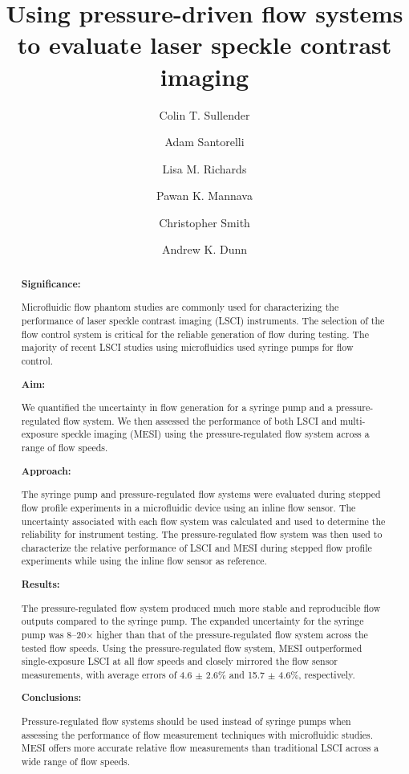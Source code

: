 \documentclass[12pt]{spieman}
\title{Using pressure-driven flow systems to evaluate laser speckle contrast imaging}
\author[a]{Colin T. Sullender}
\author[a]{Adam Santorelli}
\author[a]{Lisa M. Richards}
\author[a]{Pawan K. Mannava}
\author[a]{Christopher Smith}
\author[a,*]{Andrew K. Dunn}
\affil[a]{Department of Biomedical Engineering, The University of Texas at Austin, Austin, TX, 78712, USA}
\newcommand{\abstractsection}[1]{
  \par\addvspace{.5\baselineskip}
  \noindent\textbf{#1: }\ignorespaces
}
\begin{document}
\maketitle


\begin{abstract}

\abstractsection{Significance}
Microfluidic flow phantom studies are commonly used for characterizing the performance of laser speckle contrast imaging (LSCI) instruments. The selection of the flow control system is critical for the reliable generation of flow during testing. The majority of recent LSCI studies using microfluidics used syringe pumps for flow control.

\abstractsection{Aim}
We quantified the uncertainty in flow generation for a syringe pump and a pressure-regulated flow system. We then assessed the performance of both LSCI and multi-exposure speckle imaging (MESI) using the pressure-regulated flow system across a range of flow speeds.

\abstractsection{Approach}
The syringe pump and pressure-regulated flow systems were evaluated during stepped flow profile experiments in a microfluidic device using an inline flow sensor. The uncertainty associated with each flow system was calculated and used to determine the reliability for instrument testing. The pressure-regulated flow system was then used to characterize the relative performance of LSCI and MESI during stepped flow profile experiments while using the inline flow sensor as reference.

\abstractsection{Results}
The pressure-regulated flow system produced much more stable and reproducible flow outputs compared to the syringe pump. The expanded uncertainty for the syringe pump was 8--20$\times$ higher than that of the pressure-regulated flow system across the tested flow speeds. Using the pressure-regulated flow system, MESI outperformed single-exposure LSCI at all flow speeds and closely mirrored the flow sensor measurements, with average errors of 4.6 $\pm$ 2.6\% and 15.7 $\pm$ 4.6\%, respectively.
 
\abstractsection{Conclusions}
Pressure-regulated flow systems should be used instead of syringe pumps when assessing the performance of flow measurement techniques with microfluidic studies. MESI offers more accurate relative flow measurements than traditional LSCI across a wide range of flow speeds.

\end{abstract}
\end{document}
